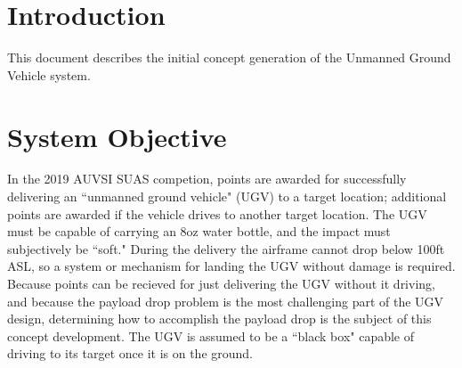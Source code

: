\documentclass[]{auvsi_doc}
\begin{document}
\begin{AUVSITitlePage}
\begin{artifacttable}
\end{artifacttable}
\end{AUVSITitlePage}

\section{Introduction}
This document describes the initial concept generation of the Unmanned Ground Vehicle system.

\section{System Objective}
In the 2019 AUVSI SUAS competion, points are awarded for successfully delivering an ``unmanned ground vehicle" (UGV) to a target location; additional points are awarded if the vehicle drives to another target location. 
The UGV must be capable of carrying an 8oz water bottle, and the impact must subjectively be ``soft."
During the delivery the airframe cannot drop below 100ft ASL, so a system or mechanism for landing the UGV without damage is required.
Because points can be recieved for just delivering the UGV without it driving, and because the payload drop problem is the most challenging part of the UGV design, determining how to accomplish the payload drop is the subject of this concept development. 
The UGV is assumed to be a ``black box" capable of driving to its target once it is on the ground.
\end{document}
